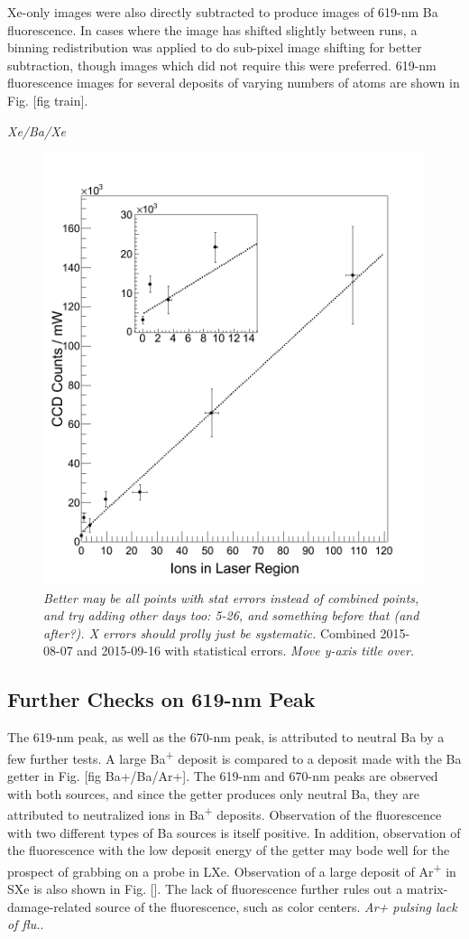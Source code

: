 Xe-only images were also directly subtracted to produce images of 619-nm Ba fluorescence.  In cases where the image has shifted slightly between runs, a binning redistribution was applied to do sub-pixel image shifting for better subtraction, though images which did not require this were preferred.  619-nm fluorescence images for several deposits of varying numbers of atoms are shown in Fig. [fig train].  

\emph{\color{gray}Xe/Ba/Xe}

\begin{figure} %
        \centering
                \includegraphics[width=.7\textwidth]{figures/fitgrouped_20150807_20150916_inset.png}
                \caption{\emph{\color{gray}Better may be all points with stat errors instead of combined points, and try adding other days too:  5-26, and something before that (and after?).  X errors should prolly just be systematic.}  Combined 2015-08-07 and 2015-09-16 with statistical errors.  \emph{\color{gray}Move y-axis title over.}}
\label{fig:lin}
\end{figure}

\subsection{Further Checks on 619-nm Peak}
\label{subsec:619identification}

The 619-nm peak, as well as the 670-nm peak, is attributed to neutral Ba by a few further tests.  A large Ba\textsuperscript{+} deposit is compared to a deposit made with the Ba getter in Fig. [fig Ba+/Ba/Ar+].  The 619-nm and 670-nm peaks are observed with both sources, and since the getter produces only neutral Ba, they are attributed to neutralized ions in Ba\textsuperscript{+} deposits.  Observation of the fluorescence with two different types of Ba sources is itself positive.  In addition, observation of the fluorescence with the low deposit energy of the getter may bode well for the prospect of grabbing on a probe in LXe.  Observation of a large deposit of Ar\textsuperscript{+} in SXe is also shown in Fig. [].  The lack of fluorescence further rules out a matrix-damage-related source of the fluorescence, such as color centers.  \emph{\color{gray}Ar+ pulsing lack of flu.}.

